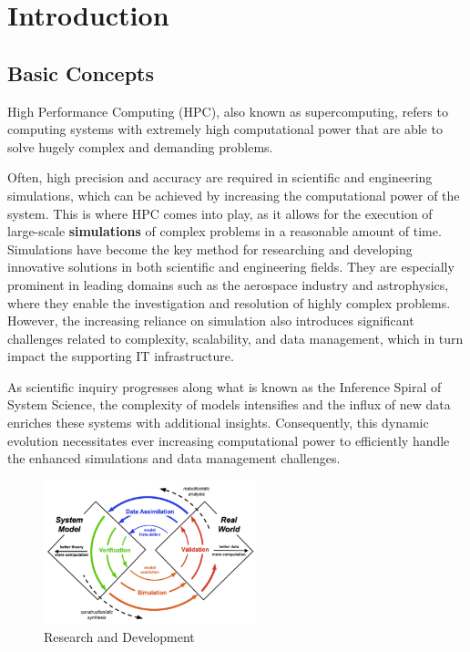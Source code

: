 \chapter{Introduction}

\section{Basic Concepts} \label{sec:basic_concepts}

High Performance Computing (HPC), also known as supercomputing, refers to computing systems with extremely high computational power that are able to solve hugely complex and demanding problems. \cite{europaHighPerformance}

Often, high precision and accuracy are required in scientific and engineering simulations, which can be achieved by increasing the computational power of the system. This is where HPC comes into play, as it allows for the execution of large-scale \textbf{simulations} of complex problems in a reasonable amount of time. Simulations have become the key method for researching and developing innovative solutions in both scientific and engineering fields. They are especially prominent in leading domains such as the aerospace industry and astrophysics, where they enable the investigation and resolution of highly complex problems. However, the increasing reliance on simulation also introduces significant challenges related to complexity, scalability, and data management, which in turn impact the supporting IT infrastructure.

As scientific inquiry progresses along what is known as the Inference Spiral of System Science, the complexity of models intensifies and the influx of new data enriches these systems with additional insights. Consequently, this dynamic evolution necessitates ever increasing computational power to efficiently handle the enhanced simulations and data management challenges.

\begin{figure}[H]
    \centering
    \includegraphics[width=0.55\textwidth]{assets/research.png}
    \caption{Research and Development}
    \label{fig:research}
\end{figure}

